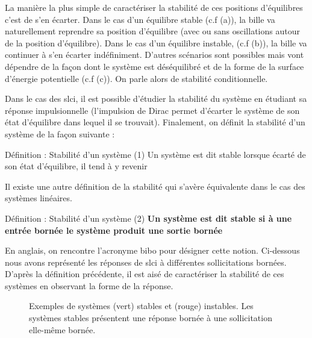La manière la plus simple de caractériser la stabilité de ces positions 
d'équilibres c'est de s'en écarter. 
Dans le cas d'un équilibre stable 
(c.f  (a)), la bille va naturellement reprendre sa position 
d'équilibre (avec ou sans oscillations autour de la position d'équilibre). 
Dans le cas d'un équilibre instable, 
(c.f  (b)), la bille va continuer à s'en écarter indéfiniment. 
D'autres scénarios sont possibles mais vont dépendre de la façon dont le 
système est déséquilibré et de la forme de la surface d'énergie potentielle 
(c.f  (c)). On parle alors de stabilité conditionnelle.

Dans le cas des \gls{slci}, il est possible d'étudier la stabilité du système 
en étudiant sa réponse impulsionnelle (l'impulsion de Dirac permet d'écarter 
le système de son état d'équilibre dans lequel il se trouvait). 
Finalement, on définit la stabilité d'un système de la façon 
suivante :
\begin{definition}{Définition : Stabilité d'un système (1)}
Un système est dit stable lorsque écarté de son état d'équilibre, il 
tend à y revenir
\end{definition}
Il existe une autre définition de la stabilité qui s'avère équivalente 
dans le cas des systèmes linéaires.
\begin{definition}{Définition : Stabilité d'un système (2)}
\textbf{Un système est dit stable si à une entrée bornée le système produit 
une sortie bornée}
\end{definition}
En anglais, on rencontre l'acronyme \gls{bibo}
pour désigner cette notion.
Ci-dessous nous avons représenté les réponses de \gls{slci} à différentes
sollicitations bornées. D'après la définition précédente, il est aisé
de caractériser la stabilité de ces systèmes en observant la forme de la 
réponse.
\begin{figure}[!t]
    \centering
    
    \caption{Exemples de systèmes (vert) stables et (rouge) instables. Les 
    systèmes stables présentent une réponse bornée à une sollicitation elle-même
    bornée.}
\end{figure}
\newpage
